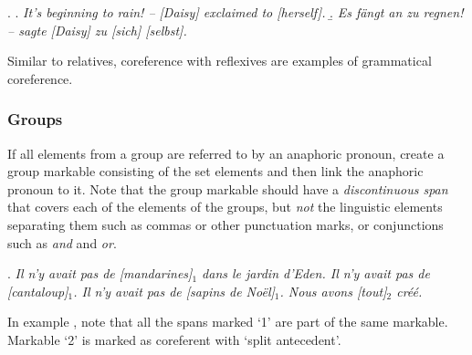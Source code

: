 \documentclass[a4paper]{article}
\begin{document}
\ex.
\a. {\sl It's beginning to rain! -- [Daisy] exclaimed to [herself].}
\b.  {\sl Es fängt an zu regnen! -- sagte [Daisy] zu [sich] [selbst].}

% 


Similar to relatives, coreference with reflexives are examples of grammatical
coreference. %


\subsubsection{\label{sec:groups}Groups}

If all elements from a group are referred to by an anaphoric pronoun, create a
group markable consisting of the set elements and then link the anaphoric
pronoun to it. Note that the group markable should have a \emph{discontinuous
span} that covers each of the elements of the groups, but \emph{not} the
linguistic elements separating them such as commas or other punctuation marks,
or conjunctions such as \textsl{and} and \textsl{or}.

\ex. 
\textsl{Il n'y avait pas de [mandarines]$_1$ dans le jardin d'Eden. Il n'y
avait pas de [cantaloup]$_1$. Il n'y avait pas de [sapins de Noël]$_1$. Nous
avons [tout]$_2$ créé.}

In example \Last, note that all the spans marked `1' are part of the same
markable. Markable `2' is marked as coreferent with `split antecedent'.
\end{document}
